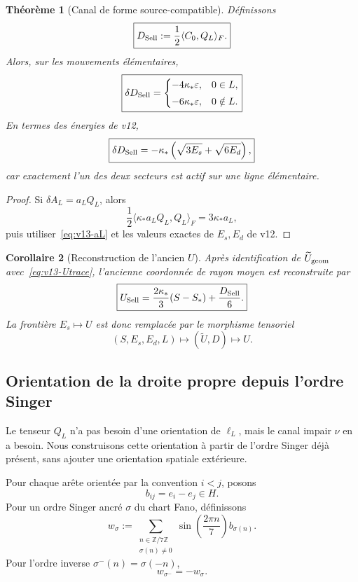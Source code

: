 \documentclass[11pt,a4paper]{article}
\newtheorem{theorem}{Théorème}[section]
\newtheorem{corollary}[theorem]{Corollaire}
\begin{document}
\begin{theorem}[Canal de forme source-compatible]\label{thm:v13-D}
Définissons
\begin{equation}\label{eq:v13-D}
 \boxed{
 D_{\rm Sell}
 :=
 \frac12\langle C_0,Q_L\rangle_F.}
\end{equation}
Alors, sur les mouvements élémentaires,
\begin{equation}\label{eq:v13-D-increments}
 \boxed{
 \delta D_{\rm Sell}
 =
 \begin{cases}
 -4\kappa_*\varepsilon,&0\in L,\\[1mm]
 -6\kappa_*\varepsilon,&0\notin L.
 \end{cases}}
\end{equation}
En termes des énergies de v12,
\begin{equation}\label{eq:v13-D-energy}
 \boxed{
 \delta D_{\rm Sell}
 =
 -\kappa_*
 \left(\sqrt{3E_s}+\sqrt{6E_d}\right),}
\end{equation}
car exactement l'un des deux secteurs est actif sur une ligne élémentaire.
\end{theorem}

\begin{proof}
Si $\delta A_L=a_LQ_L$, alors
\[
 \frac12\langle \kappa_*a_LQ_L,Q_L\rangle_F
 =3\kappa_*a_L,
\]
puis utiliser~\eqref{eq:v13-aL} et les valeurs exactes de $E_s,E_d$ de v12.
\end{proof}

\begin{corollary}[Reconstruction de l'ancien $U$]\label{cor:v13-U-old}
Après identification de $\widetilde U_{\rm geom}$ avec~\eqref{eq:v13-Utrace}, l'ancienne coordonnée de rayon moyen est reconstruite par
\[
 \boxed{
 U_{\rm Sell}
 =
 \frac{2\kappa_*}{3}(S-S_*)+\frac{D_{\rm Sell}}6.}
\]
La frontière $E_s\mapsto U$ est donc remplacée par le morphisme tensoriel
\[
 (S,E_s,E_d,L)\longmapsto(\widetilde U,D)\longmapsto U.
\]
\end{corollary}

\subsection{Orientation de la droite propre depuis l'ordre Singer}

Le tenseur $Q_L$ n'a pas besoin d'une orientation de $\ell_L$, mais le canal impair $\nu$ en a besoin. Nous construisons cette orientation à partir de l'ordre Singer déjà présent, sans ajouter une orientation spatiale extérieure.

Pour chaque arête orientée par la convention $i<j$, posons
\[
 b_{ij}=e_i-e_j\in H.
\]
Pour un ordre Singer ancré $\sigma$ du chart Fano, définissons
\begin{equation}\label{eq:v13-wsigma}
 w_\sigma
 :=
 \sum_{\substack{n\in\mathbb Z/7\mathbb Z\\ \sigma(n)\ne0}}
 \sin\!\left(\frac{2\pi n}{7}\right)b_{\sigma(n)}.
\end{equation}
Pour l'ordre inverse $\sigma^-(n)=\sigma(-n)$,
\begin{equation}\label{eq:v13-wflip}
 \boxed{w_{\sigma^-}=-w_\sigma.}
\end{equation}
\end{document}
